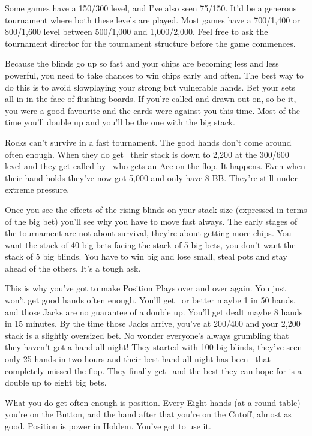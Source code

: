 Some games have a 150/300 level, and I've also seen 75/150. It'd be
a generous tournament where both these levels are played. Most games
have a 700/1,400 or 800/1,600 level between 500/1,000 and 1,000/2,000. Feel
free to ask the tournament director for the tournament structure before
the game commences.

Because the blinds go up so fast and your chips are becoming less and
less powerful, you need to take chances to win chips early and often.
The best way to do this is to avoid slowplaying your strong but
vulnerable hands. Bet your sets all-in in the face of flushing boards.
If you're called and drawn out on, so be it, you were a good favourite
and the cards were against you this time. Most of the time you'll double
up and you'll be the one with the big stack.

Rocks can't survive in a fast tournament. The good hands don't come
around often enough. When they do get \Kh\Kc\ their stack is down to 2,200 at
the 300/600 level and they get called by \As\Qs\ who gets an Ace on the flop.
It happens. Even when their hand holds they've now got 5,000 and only have
8 BB. They're still under extreme pressure.

Once you see the effects of the rising blinds on your stack size
(expressed in terms of the big bet) you'll see why you have to move
fast always. The early stages of the tournament are not about survival,
they're about getting more chips. You want the stack of 40 big bets facing
the stack of 5 big bets, you don't want the stack of 5 big blinds. You
have to win big and lose small, steal pots and stay ahead of the others.
It's a tough ask.

This is why you've got to make Position Plays over and over again.
You just won't get good hands often enough. You'll get \Jh\Jc\ or better
maybe 1 in 50 hands, and those Jacks are no guarantee of a double up.
You'll get dealt maybe 8 hands in 15 minutes.
By the time those Jacks arrive, you've at 200/400 and your 2,200 stack is
a slightly oversized bet. No wonder everyone's always grumbling that
they haven't got a hand all night! They started with 100 big blinds,
they've seen only 25 hands in two hours and their best hand all
night has been \Jd\nined\ that completely missed the flop.
They finally get \Jh\Jc\ and the best they can hope for is a double
up to eight big bets.

What you do get often enough is position. Every Eight hands (at a
round table) you're on the Button, and the hand after that you're on
the Cutoff, almost as good. Position is power in Holdem. You've got to
use it.


